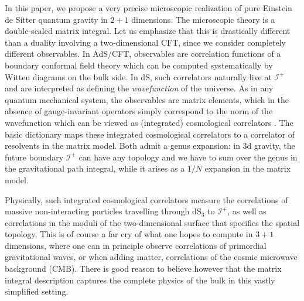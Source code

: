 \documentclass[12pt,a4paper]{article}
\begin{document}
\medskip

 In this paper, we propose a very precise microscopic realization of pure Einstein de Sitter quantum gravity in $2{+}1$ dimensions. The microscopic theory is a double-scaled matrix integral. Let us emphasize that this is drastically different than a duality involving a two-dimensional CFT, since we consider completely different observables. In AdS/CFT, observables are correlation functions of a boundary conformal field theory which can be computed systematically by Witten diagrams on the bulk side. In dS, such correlators naturally live at $\mathcal{I}^+$ and are interpreted as defining the \emph{wavefunction} of the universe. As in any quantum mechanical system, the observables are matrix elements, which in the absence of gauge-invariant operators simply correspond to the norm of the wavefunction which can be viewed as (integrated) cosmological correlators \cite{Maldacena:2002vr}. The basic dictionary maps these integrated cosmological correlators to a correlator of resolvents in the matrix model. Both admit a genus expansion: in 3d gravity, the future boundary $\mathcal{I}^+$ can have any topology and we have to sum over the genus in the gravitational path integral, while it arises as a $1/N$ expansion in the matrix model. 

Physically, such integrated cosmological correlators measure the correlations of massive non-interacting particles travelling through $\mathrm{dS}_3$ to $\mathcal{I}^+$, as well as correlations in the moduli of the two-dimensional surface that specifies the spatial topology. This is of course a far cry of what one hopes to compute in $3{+}1$ dimensions, where one can in principle observe correlations of primordial gravitational waves, or when adding matter, correlations of the cosmic microwave background (CMB). There is good reason to believe however that the matrix integral description captures the complete physics of the bulk in this vastly simplified setting.
\end{document}
